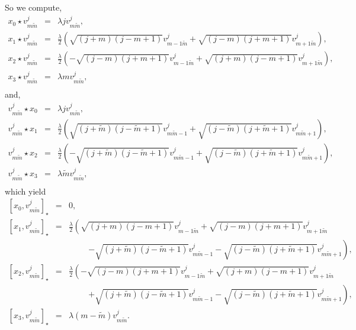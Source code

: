 \documentclass[a4paper,11pt]{article} %
\numberwithin{equation}{section} %
\numberwithin{figure}{section} %
\theoremstyle{plain} %
\theoremstyle{definition} %
\theoremstyle{remark} %
\begin{document}
So we compute,
\begin{eqnarray*}
 x_{0} \star v^{j}_{m \tilde{m}} &=& \lambda j v^{j}_{m \tilde{m}} , \\ 
 x_{1} \star v^{j}_{m \tilde{m}} &=& \frac{\lambda}{2} \left( \sqrt{(j+m)(j-m+1)} v^{j}_{m-1 \tilde{m}} + \sqrt{(j-m)(j+m+1)} v^{j}_{m+1 \tilde{m}} \right), \\
 x_{2} \star v^{j}_{m \tilde{m}} &=& \frac{\lambda}{2} \left( - \sqrt{(j-m)(j+m+1)} v^{j}_{m-1 \tilde{m}} + \sqrt{(j+m)(j-m+1)} v^{j}_{m+1 \tilde{m}}\right), \\
 x_{3} \star v^{j}_{m \tilde{m}} &=& \lambda m v^{j}_{m \tilde{m}}, \\
\end{eqnarray*}   
and,
\begin{eqnarray*}
 v^{j}_{m \tilde{m}} \star x_{0} &=& \lambda j v^{j}_{m \tilde{m}} , \\ 
 v^{j}_{m \tilde{m}} \star x_{1} &=& \frac{\lambda}{2} \left( \sqrt{(j+\tilde{m})(j-\tilde{m}+1)} v^{j}_{m \tilde{m}-1} + \sqrt{(j-\tilde{m})(j+\tilde{m}+1)} v^{j}_{m \tilde{m}+1}\right), \\
 v^{j}_{m \tilde{m}} \star x_{2} &=& \frac{\lambda}{2} \left( - \sqrt{(j+\tilde{m})(j-\tilde{m}+1)} v^{j}_{m \tilde{m}-1} + \sqrt{(j-\tilde{m})(j+\tilde{m}+1)} v^{j}_{m \tilde{m}+1}\right), \\
 v^{j}_{m \tilde{m}} \star x_{3} &=& \lambda \tilde{m} v^{j}_{m \tilde{m}}, \\
\end{eqnarray*}  
which yield
\begin{eqnarray*}
 \left[ x_{0} , v^{j}_{m \tilde{m}} \right]_{\star} &=& 0, \\ 
 \left[ x_{1} , v^{j}_{m \tilde{m}} \right]_{\star} &=& \frac{\lambda}{2} \left( \sqrt{(j+m)(j-m+1)} v^{j}_{m-1 \tilde{m}} + \sqrt{(j-m)(j+m+1)} v^{j}_{m+1 \tilde{m}} \right.\\ 
                                                    && \hspace{1cm} \left. - \sqrt{(j+\tilde{m})(j-\tilde{m}+1)} v^{j}_{m \tilde{m}-1} - \sqrt{(j-\tilde{m})(j+\tilde{m}+1)} v^{j}_{m \tilde{m}+1} \right), \\
 \left[ x_{2} , v^{j}_{m \tilde{m}} \right]_{\star} &=& \frac{\lambda}{2} \left( - \sqrt{(j-m)(j+m+1)} v^{j}_{m-1 \tilde{m}} + \sqrt{(j+m)(j-m+1)} v^{j}_{m+1 \tilde{m}} \right.\\ 
                                                    && \hspace{1cm} \left. + \sqrt{(j+\tilde{m})(j-\tilde{m}+1)} v^{j}_{m \tilde{m}-1} - \sqrt{(j-\tilde{m})(j+\tilde{m}+1)} v^{j}_{m \tilde{m}+1}  \right), \\
 \left[ x_{3} , v^{j}_{m \tilde{m}} \right]_{\star} &=& \lambda (m-\tilde{m}) v^{j}_{m \tilde{m}} . \\ 
\end{eqnarray*}  
\end{document}
